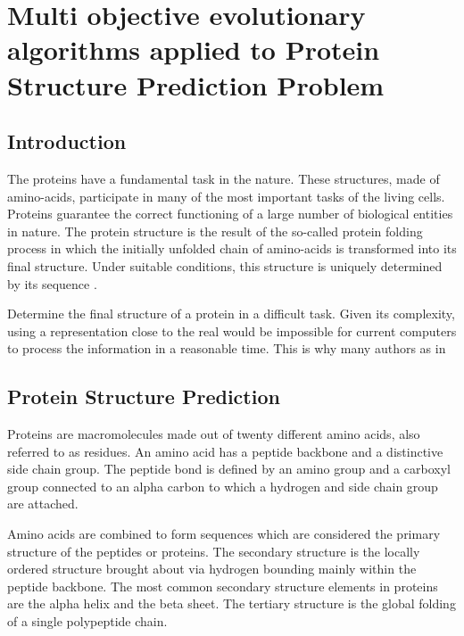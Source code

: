 
\chapter{Multi objective evolutionary algorithms applied to Protein Structure Prediction Problem}


\section{Introduction} \label{sec:intro}


The proteins have a fundamental task in the nature. These structures, made of amino-acids, participate in many of the most important tasks of the living cells. Proteins guarantee the correct functioning of a large number of biological entities in nature. The protein structure is the result of the so-called protein folding process in which the initially unfolded chain of amino-acids is transformed into its final structure. Under suitable conditions, this structure is uniquely determined by its sequence \cite{santana2004protein}.

Determine the final structure of a protein in a difficult task. Given its complexity, using a representation close to the real would be impossible for current computers to process the information in a reasonable time. This is why many authors as in \cite{lin2011protein, custodio2004investigation}



\section{Protein Structure Prediction} \label{sec:proteinfolding}


Proteins are macromolecules made out of  twenty different amino acids, also referred to as residues. An amino acid has a peptide backbone and a distinctive side chain group. The peptide bond is defined by an amino group and a carboxyl group connected to an alpha carbon to which  a hydrogen and side chain group are attached.


Amino acids are combined to form sequences which are considered the primary structure of the peptides or proteins. The secondary structure is the locally ordered structure brought about via hydrogen bounding mainly within the peptide backbone. The most common secondary structure elements in proteins are the alpha helix and the beta sheet. The tertiary structure is the global folding of a single polypeptide chain.


